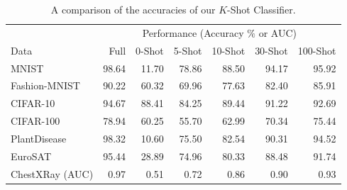 \documentclass{article}
\theoremstyle{definition}
\begin{document}
\begin{table}[h!]
	\centering
	\footnotesize
	
	\begin{tabular}{@{} l r r r r r r @{}}
		& \multicolumn{6}{c}{Performance (Accuracy $\%$ or AUC)}\\
		\cmidrule{2-7}
		Data & Full & 0-Shot & 5-Shot & 10-Shot & 30-Shot & 100-Shot \\
		\toprule
		
		MNIST & 98.64 & 11.70 & 78.86 & 88.50 & 94.17 & 95.92 \\
		Fashion-MNIST & 90.22 & 60.32 & 69.96 & 77.63 & 82.40 & 85.91 \\
		CIFAR-10 & 94.67 & 88.41 & 84.25 & 89.44 & 91.22 & 92.69 \\
		CIFAR-100 & 78.94 & 60.25 & 55.70 & 62.99 & 70.34 & 75.44 \\
		PlantDisease & 98.32 & 10.60 & 75.50 & 82.54 & 90.31 & 94.52 \\
		EuroSAT & 95.44 & 28.89 & 74.96 & 80.33 & 88.48 & 91.74 \\
		ChestXRay (AUC) & 0.97 & 0.51 & 0.72 & 0.86 & 0.90 & 0.93 \\
		
		\bottomrule
	\end{tabular}
	
	\caption{A comparison of the accuracies of our $K$-Shot Classifier.}
	\label{tab:results_nondp}
\end{table}
\end{document}
